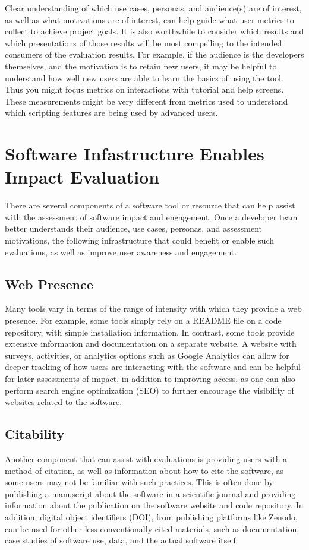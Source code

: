 \documentclass{article}
\begin{document}
Clear understanding of which use cases, personas, and audience(s) are of interest, as well as what motivations are of interest, can help guide what user metrics to collect to achieve project goals. It is also worthwhile to consider which results and which presentations of those results will be most compelling to the intended consumers of the evaluation results. For example, if the audience is the developers themselves, and the motivation is to retain new users, it may be helpful to understand how well new users are able to learn the basics of using the tool. Thus you might focus metrics on interactions with tutorial and help screens.  These measurements might be very different from metrics used to understand which scripting features are being used by advanced users. 

\section{Software Infastructure Enables Impact Evaluation}
There are several components of a software tool or resource that can help assist with the assessment of software impact and engagement. Once a developer team better understands their audience, use cases, personas, and assessment motivations, the following infrastructure that could benefit or enable such evaluations, as well as improve user awareness and engagement. 

\subsection{Web Presence}
Many tools vary in terms of the range of intensity with which they provide a web presence. For example, some tools simply rely on a README file on a code repository, with simple installation information. In contrast, some tools provide extensive information and documentation on a separate website. A website with surveys, activities, or analytics options such as Google Analytics can allow for deeper tracking of how users are interacting with the software and can be helpful for later assessments of impact, in addition to improving access, as one can also perform search engine optimization (SEO) to further encourage the visibility of websites related to the software.

\subsection{Citability}
Another component that can assist with evaluations is providing users with a method of citation, as well as information about how to cite the software, as some users may not be familiar with such practices. This is often done by publishing a manuscript about the software in a scientific journal and providing information about the publication on the software website and code repository. In addition, digital object identifiers (DOI), from publishing platforms like Zenodo, can be used for other less conventionally cited materials, such as documentation, case studies of software use, data, and the actual software itself.
\end{document}
